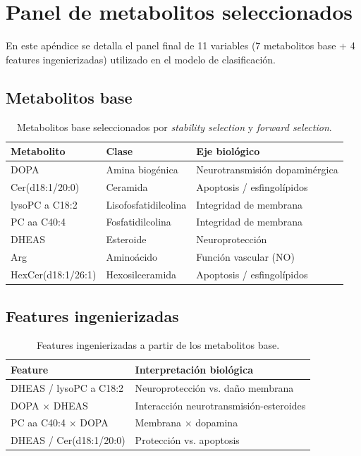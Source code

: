\chapter{Panel de metabolitos seleccionados}\label{app:metabolitos}

En este apéndice se detalla el panel final de 11 variables (7 metabolitos base + 4 features ingenierizadas) utilizado en el modelo de clasificación.

\section{Metabolitos base}

\begin{table}[h]
\centering
\caption{Metabolitos base seleccionados por \textit{stability selection} y \textit{forward selection}.}
\label{tab:metabolitos_base}
\begin{tabular}{lll}
\hline
\textbf{Metabolito} & \textbf{Clase} & \textbf{Eje biológico} \\
\hline
DOPA & Amina biogénica & Neurotransmisión dopaminérgica \\
Cer(d18:1/20:0) & Ceramida & Apoptosis / esfingolípidos \\
lysoPC a C18:2 & Lisofosfatidilcolina & Integridad de membrana \\
PC aa C40:4 & Fosfatidilcolina & Integridad de membrana \\
DHEAS & Esteroide & Neuroprotección \\
Arg & Aminoácido & Función vascular (NO) \\
HexCer(d18:1/26:1) & Hexosilceramida & Apoptosis / esfingolípidos \\
\hline
\end{tabular}
\end{table}

\section{Features ingenierizadas}

\begin{table}[h]
\centering
\caption{Features ingenierizadas a partir de los metabolitos base.}
\label{tab:ratios}
\begin{tabular}{ll}
\hline
\textbf{Feature} & \textbf{Interpretación biológica} \\
\hline
DHEAS / lysoPC a C18:2 & Neuroprotección vs. daño membrana \\
DOPA $\times$ DHEAS & Interacción neurotransmisión-esteroides \\
PC aa C40:4 $\times$ DOPA & Membrana $\times$ dopamina \\
DHEAS / Cer(d18:1/20:0) & Protección vs. apoptosis \\
\hline
\end{tabular}
\end{table}


